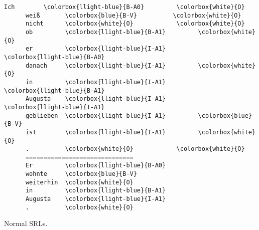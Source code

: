 \begin{minipage}{1.0\linewidth}
  \begin{srl}
  \centering
    \begin{BVerbatim}[commandchars=\\\{\}, fontsize=\footnotesize]
      Ich        \colorbox{llight-blue}{B-A0}         \colorbox{white}{O}
      weiß       \colorbox{blue}{B-V}          \colorbox{white}{O}
      nicht      \colorbox{white}{O}            \colorbox{white}{O}
      ob         \colorbox{llight-blue}{B-A1}         \colorbox{white}{O}
      er         \colorbox{llight-blue}{I-A1}         \colorbox{llight-blue}{B-A0}
      danach     \colorbox{llight-blue}{I-A1}         \colorbox{white}{O}
      in         \colorbox{llight-blue}{I-A1}         \colorbox{llight-blue}{B-A1}
      Augusta    \colorbox{llight-blue}{I-A1}         \colorbox{llight-blue}{I-A1}
      geblieben  \colorbox{llight-blue}{I-A1}         \colorbox{blue}{B-V}
      ist        \colorbox{llight-blue}{I-A1}         \colorbox{white}{O}
      .          \colorbox{white}{O}            \colorbox{white}{O}
      ==============================
      Er         \colorbox{llight-blue}{B-A0}
      wohnte     \colorbox{blue}{B-V}
      weiterhin  \colorbox{white}{O}
      in         \colorbox{llight-blue}{B-A1}
      Augusta    \colorbox{llight-blue}{I-A1}
      .          \colorbox{white}{O}
    \end{BVerbatim}
    \caption{Normal SRLs.}
  \end{srl}
\end{minipage}

